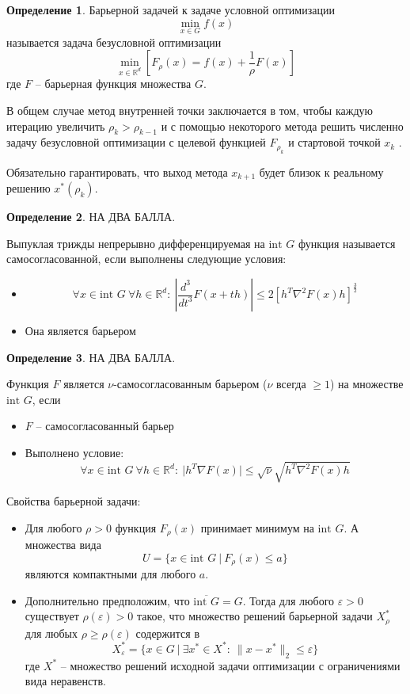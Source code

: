 \documentclass[a4paper,12pt]{article}
\renewcommand{\leq}{\ensuremath{\leqslant}}
\renewcommand{\geq}{\ensuremath{\geqslant}}
\theoremstyle{plain}
\theoremstyle{definition}
\newtheorem{definition}{Определение}[section]
\theoremstyle{remark}
\begin{document}
\begin{definition}
  Барьерной задачей к задаче условной оптимизации
  \[
    \min_{x \in G} f(x)
  \]
  называется задача безусловной оптимизации
  \[
    \min_{x \in \mathbb{R}^d}\left[F_\rho(x) = f(x) + \frac{1}{\rho}F(x)\right]
  \]
  где $F$ -- барьерная функция множества $G$.
\end{definition}

В общем случае метод внутренней точки заключается в том, чтобы каждую итерацию увеличить $\rho_k > \rho_{k - 1}$ и с помощью некоторого метода решить численно задачу безусловной оптимизации с целевой функцией $F_{\rho_k}$ и стартовой точкой $x_k$
. 

Обязательно гарантировать, что выход метода $x_{k + 1}$ будет близок к реальному решению $x^*(\rho_k)$.

\begin{definition}
  НА ДВА БАЛЛА.

  Выпуклая трижды непрерывно дифференцируемая на $\text{int }G$ функция называется самосогласованной, если выполнены следующие условия:
  \begin{itemize}
    \item 
    \[
      \forall x \in \text{int }G \: \forall h \in \mathbb{R}^d :\: \left\vert\frac{d^3}{dt^3}F(x + th)\right\vert \leq 2[h^T\nabla^2F(x)h]^{\frac{3}{2}}
    \]
    \item Она является барьером
  \end{itemize}
\end{definition}

\begin{definition}
  НА ДВА БАЛЛА.

  Функция $F$ является $\nu$-самосогласованным барьером ($\nu$ всегда $\geq 1$) на множестве $\text{int }G$, если
  \begin{itemize}
    \item $F$ -- самосогласованный барьер
    \item Выполнено условие:
    \[
      \forall x \in \text{int }G \: \forall h \in \mathbb{R}^d :\: \vert h^T \nabla F(x)\vert \leq \sqrt{\nu}\sqrt{h^T \nabla^2 F(x)h}
    \]
  \end{itemize}
\end{definition}

Свойства барьерной задачи:
\begin{itemize}
	\item Для любого $\rho > 0$ функция $F_\rho(x)$ принимает минимум на $\text{int }G$. А множества вида
	\[
		U = \{x \in \text{int }G \:\vert\: F_\rho(x) \leq a\}
	\]
	являются компактными для любого $a$.
	\item Дополнительно предположим, что $\overline{\text{int }G} = G$. Тогда для любого $\varepsilon > 0$ существует $\rho(\varepsilon) > 0$ такое, что множество решений барьерной задачи $X_\rho^*$ для любых $\rho \geq \rho(\varepsilon) $ содержится в 
	\[
		X_\varepsilon^* = \{x \in G \:\vert\: \exists x^* \in X^* :\: \|x - x^*\|_2 \leq \varepsilon\}
	\]
	где $X^*$ -- множество решений исходной задачи оптимизации с ограничениями вида неравенств.
\end{itemize}
\end{document}
